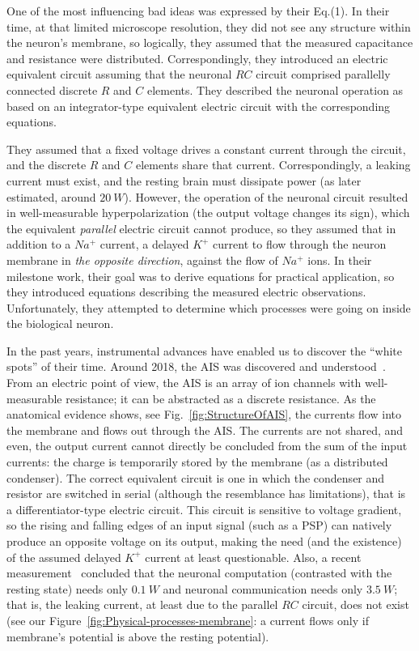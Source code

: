 One of the most influencing bad ideas was expressed by their Eq.(1).
In their time, at that limited microscope resolution, they did not
see any structure within the neuron's membrane, so logically, they
assumed that the measured capacitance and resistance were distributed.
Correspondingly, they introduced an electric equivalent circuit assuming
that the neuronal $RC$ circuit comprised parallelly connected discrete
$R$ and $C$ elements. They described the neuronal operation as based
on an integrator-type equivalent electric circuit with the corresponding
equations.

They assumed that a fixed voltage drives a constant current through
the circuit, and the discrete $R$ and $C$ elements share that current.
Correspondingly, a leaking current must exist, and the resting brain
must dissipate power (as later estimated, around $20\ W$). However,
the operation of the neuronal circuit resulted in well-measurable
hyperpolarization (the output voltage changes its sign), which the
equivalent \emph{parallel} electric circuit cannot produce, so they
assumed that in addition to a $Na^{+}$ current, a delayed $K^{+}$
current to flow through the neuron membrane in \emph{the opposite
direction}, against the flow of $Na^{+}$ ions. In their milestone
work, their goal was to derive equations for practical application,
so they introduced equations describing the measured electric observations.
Unfortunately, they attempted to determine which processes were going
on inside the biological neuron.

In the past years, instrumental advances have enabled us to discover
the ``white spots'' of their time. Around 2018, the 
AIS
 was
discovered and understood~\cite{AIS_Updated_Viewpoint:2018,ActionPotentialGenerationNatrium:2008}.
From an electric point of view, the 
AIS
 is an array of ion
channels with well-measurable resistance; it can be abstracted as
a discrete resistance. As the anatomical evidence shows, see Fig.~\ref{fig:StructureOfAIS},
the currents flow into the membrane and flows out through the
AIS.
The currents are not shared, and even, the output current cannot directly
be concluded from the sum of the input currents: the charge is temporarily
stored by the membrane (as a distributed condenser). The correct equivalent
circuit is one in which the condenser and resistor are switched in
serial (although the resemblance has limitations), that is a differentiator-type
electric circuit. This circuit is sensitive to voltage gradient, so
the rising and falling edges of an input signal (such as a 
PSP)
can natively produce an opposite voltage on its output, making the
need (and the existence) of the assumed delayed $K^{+}$ current at
least questionable. Also, a recent measurement~\cite{EnergyNeuralCommunication:2021}
concluded that the neuronal computation (contrasted with the resting
state) needs only $0.1\ W$ and neuronal communication needs only
$3.5\ W$; that is, the leaking current, at least due to the parallel
$RC$ circuit, does not exist (see our Figure~\ref{fig:Physical-processes-membrane}:
a current flows only if membrane's potential is above the resting
potential).

